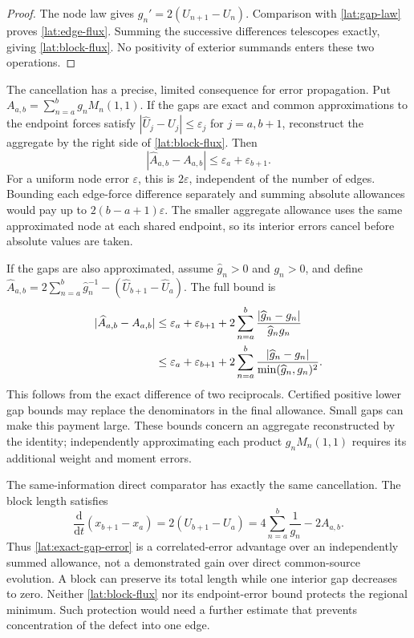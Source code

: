\begin{proof}
The node law gives $g_n'=2(U_{n+1}-U_n)$. Comparison with
\eqref{lat:gap-law} proves \eqref{lat:edge-flux}. Summing the
successive differences telescopes exactly, giving
\eqref{lat:block-flux}. No positivity of exterior summands enters
these two operations.
\end{proof}

The cancellation has a precise, limited consequence for error
propagation. Put $A_{a,b}=\sum_{n=a}^b g_nM_n(1,1)$. If the
gaps are exact and common approximations to the endpoint forces
satisfy $|\widehat U_j-U_j|\le\varepsilon_j$ for
$j=a,b+1$, reconstruct the aggregate by the right side of
\eqref{lat:block-flux}. Then
\begin{equation}
 |\widehat A_{a,b}-A_{a,b}|
 \le\varepsilon_a+\varepsilon_{b+1}.
 \label{lat:exact-gap-error}
\end{equation}
For a uniform node error $\varepsilon$, this is $2\varepsilon$,
independent of the number of edges. Bounding each edge-force
difference separately and summing absolute allowances would pay
up to $2(b-a+1)\varepsilon$. The smaller aggregate allowance uses
the same approximated node at each shared endpoint, so its interior
errors cancel before absolute values are taken.

If the gaps are also approximated, assume $\widehat g_n>0$ and
$g_n>0$, and define
$\widehat A_{a,b}=2\sum_{n=a}^b\widehat g_n^{-1}
-(\widehat U_{b+1}-\widehat U_a)$. The full bound is
\begin{align}
 |\widehat A_{a,b}-A_{a,b}|
 &\le\varepsilon_a+\varepsilon_{b+1}
       +2\sum_{n=a}^b
          \frac{|\widehat g_n-g_n|}{\widehat g_n g_n}
                                                        \notag\\
 &\le\varepsilon_a+\varepsilon_{b+1}
       +2\sum_{n=a}^b
          \frac{|\widehat g_n-g_n|}
               {\min(\widehat g_n,g_n)^2}.
 \label{lat:uncertain-gap-error}
\end{align}
This follows from the exact difference of two reciprocals. Certified
positive lower gap bounds may replace the denominators in the final
allowance. Small gaps can make this payment large. These bounds
concern an aggregate reconstructed by the identity; independently
approximating each product $g_nM_n(1,1)$ requires its additional
weight and moment errors.

The same-information direct comparator has exactly the same
cancellation. The block length satisfies
\begin{equation}
 \frac{\mathrm d}{\mathrm dt}(x_{b+1}-x_a)
       =2(U_{b+1}-U_a)
       =4\sum_{n=a}^b\frac1{g_n}-2A_{a,b}.
 \label{lat:block-length}
\end{equation}
Thus \eqref{lat:exact-gap-error} is a correlated-error advantage
over an independently summed allowance, not a demonstrated gain
over direct common-source evolution. A block can preserve its total
length while one interior gap decreases to zero. Neither
\eqref{lat:block-flux} nor its endpoint-error bound protects the
regional minimum. Such protection would need a further estimate
that prevents concentration of the defect into one edge.

